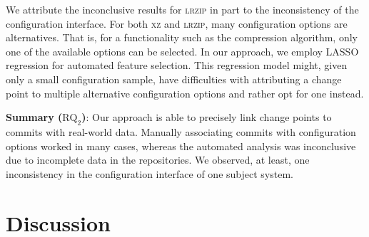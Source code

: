 \documentclass[sigconf]{acmart}
\newcommand{\greybox}[1]{
	\begin{mdframed}[backgroundcolor=black!10!white,linewidth=0pt,backgroundcolor=indigo2!10,linewidth=0pt,innerleftmargin=5pt,innertopmargin=5pt]
		#1
	\end{mdframed}
}
\begin{document}
	We attribute the inconclusive results for \textsc{lrzip} in part to the inconsistency of the configuration interface. For both \textsc{xz} and \textsc{lrzip}, many configuration options are alternatives. That is, for a functionality such as the compression algorithm, only one of the available options can be selected. In our approach, we employ LASSO regression for automated feature selection. This regression model might, given only a small configuration sample, have difficulties with attributing a change point to multiple alternative configuration options and rather opt for one instead.  %
	\vspace{2mm}
	\greybox{
		\textbf{Summary ($\text{RQ}_2$)}: Our approach is able to precisely link change points to commits with real-world data. Manually associating commits with configuration options worked in many cases, whereas the automated analysis was inconclusive due to incomplete data in the repositories. We observed, at least, one inconsistency in the configuration interface of one subject system.
	}
	
	\section{Discussion}\label{sec:discussion}
\end{document}
